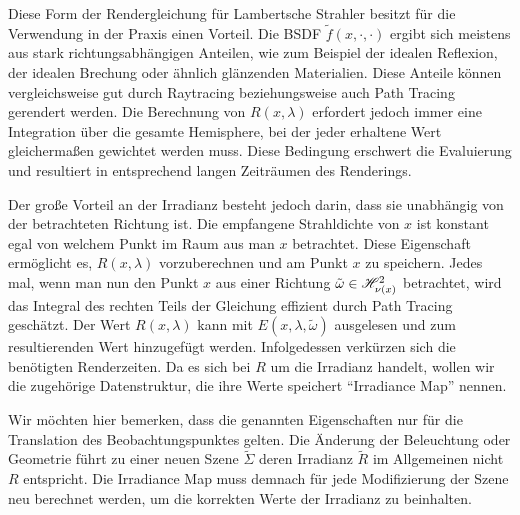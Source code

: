 		Diese Form der Rendergleichung für Lambertsche Strahler besitzt für die Verwendung in der Praxis einen Vorteil.
		Die BSDF $\tilde{f}(x,\cdot,\cdot)$ ergibt sich meistens aus stark richtungsabhängigen Anteilen, wie zum Beispiel der idealen Reflexion, der idealen Brechung oder ähnlich glänzenden Materialien.
		Diese Anteile können vergleichsweise gut durch Raytracing beziehungsweise auch Path Tracing gerendert werden.
		Die Berechnung von $R(x,\lambda)$ erfordert jedoch immer eine Integration über die gesamte Hemisphere, bei der jeder erhaltene Wert gleichermaßen gewichtet werden muss.
		Diese Bedingung erschwert die Evaluierung und resultiert in entsprechend langen Zeiträumen des Renderings.

		Der große Vorteil an der Irradianz besteht jedoch darin, dass sie unabhängig von der betrachteten Richtung ist.
		Die empfangene Strahldichte von $x$ ist konstant egal von welchem Punkt im Raum aus man $x$ betrachtet.
		Diese Eigenschaft ermöglicht es, $R(x,\lambda)$ vorzuberechnen und am Punkt $x$ zu speichern.
		Jedes mal, wenn man nun den Punkt $x$ aus einer Richtung $\tilde{\omega}\in\mathscr{H}^{2}_{\nu(x)}$ betrachtet, wird das Integral des rechten Teils der Gleichung effizient durch Path Tracing geschätzt. Der Wert $R(x,\lambda)$ kann mit $E(x,\lambda,\tilde{\omega})$ ausgelesen und zum resultierenden Wert hinzugefügt werden.
		Infolgedessen verkürzen sich die benötigten Renderzeiten.
		Da es sich bei $R$ um die Irradianz handelt, wollen wir die zugehörige Datenstruktur, die ihre Werte speichert \enquote{Irradiance Map} nennen.

		Wir möchten hier bemerken, dass die genannten Eigenschaften nur für die Translation des Beobachtungspunktes gelten.
		Die Änderung der Beleuchtung oder Geometrie führt zu einer neuen Szene $\tilde{\Sigma}$ deren Irradianz $\tilde{R}$ im Allgemeinen nicht $R$ entspricht.
		Die Irradiance Map muss demnach für jede Modifizierung der Szene neu berechnet werden, um die korrekten Werte der Irradianz zu beinhalten.




